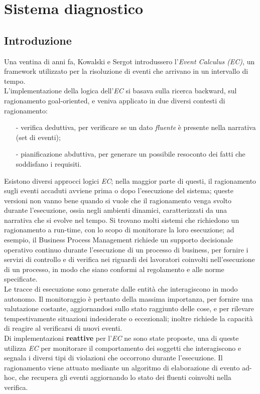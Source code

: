 \documentclass[a4paper,12pt]{report}
\begin{document}
\chapter{Sistema diagnostico}
\section{Introduzione}
Una ventina di anni fa, Kowalski e Sergot \cite{rif7} introdussero l'\textit{Event Calculus (EC)}, un framework utilizzato per la risoluzione di eventi che arrivano in un intervallo di tempo.\\
L'implementazione della logica dell'\textit{EC} si basava sulla ricerca backward, sul ragionamento goal-oriented, e veniva applicato in due diversi contesti di ragionamento:
\begin{itemize}
    \item[-] verifica deduttiva, per verificare se un dato \textit{fluente} è presente nella narrativa (set di eventi);
    \item[-] pianificazione abduttiva, per generare un possibile resoconto dei fatti che soddisfano i requisiti.
\end{itemize}
Esistono diversi approcci logici \textit{EC}; nella maggior parte di questi, il ragionamento sugli eventi accaduti avviene prima o dopo l'esecuzione del sistema; queste versioni non vanno bene quando si vuole che il ragionamento venga svolto durante l'esecuzione, ossia negli ambienti dinamici, caratterizzati da una narrativa che si evolve nel tempo. Si trovano molti sistemi che richiedono un ragionamento a run-time, con lo scopo di monitorare la loro esecuzione; ad esempio, il Business Process Management richiede un supporto decisionale operativo continuo durante l'esecuzione di un processo di business, per fornire i servizi di controllo e di verifica nei riguardi dei lavoratori coinvolti nell'esecuzione di un processo, in modo che siano conformi al regolamento e alle norme specificate.\\
Le tracce di esecuzione sono generate dalle entità che interagiscono in modo autonomo.
Il monitoraggio è pertanto della massima importanza, per fornire una valutazione costante, aggiornandosi sullo stato raggiunto delle cose, e per rilevare tempestivamente situazioni indesiderate o eccezionali; inoltre richiede la capacità di reagire al verificarsi di nuovi eventi.\\
Di implementazioni \textbf{reattive} per l'\textit{EC} ne sono state proposte, una di queste utilizza \textit{EC} per monitorare il comportamento dei soggetti che interagiscono e segnala i diversi tipi di violazioni che occorrono durante l'esecuzione. Il ragionamento viene attuato mediante un algoritmo di elaborazione di evento ad-hoc, che recupera gli eventi aggiornando lo stato dei fluenti coinvolti nella verifica.\\
\end{document}
